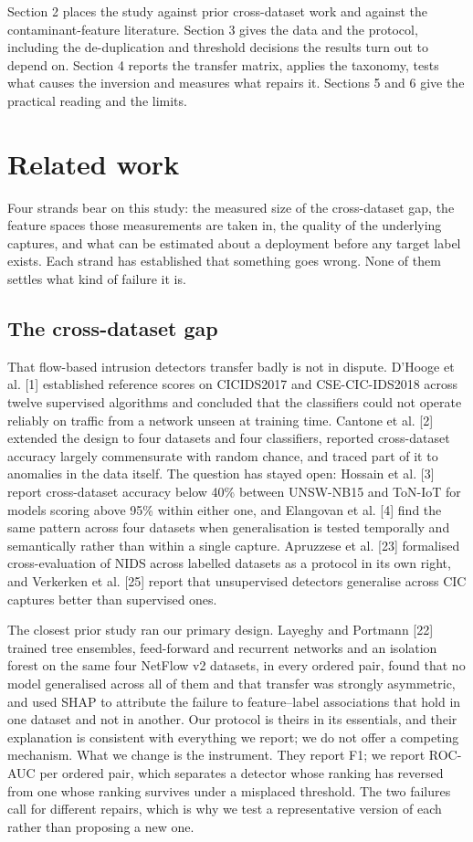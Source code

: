 \documentclass[11pt,a4paper]{article}
\begin{document}
Section 2 places the study against prior cross-dataset work and against the contaminant-feature literature. Section 3 gives the data and the protocol, including the de-duplication and threshold decisions the results turn out to depend on. Section 4 reports the transfer matrix, applies the taxonomy, tests what causes the inversion and measures what repairs it. Sections 5 and 6 give the practical reading and the limits.


\section{Related work}

Four strands bear on this study: the measured size of the cross-dataset gap, the feature spaces those measurements are taken in, the quality of the underlying captures, and what can be estimated about a deployment before any target label exists. Each strand has established that something goes wrong. None of them settles what kind of failure it is.

\subsection{The cross-dataset gap}

That flow-based intrusion detectors transfer badly is not in dispute. D'Hooge et al. [1] established reference scores on CICIDS2017 and CSE-CIC-IDS2018 across twelve supervised algorithms and concluded that the classifiers could not operate reliably on traffic from a network unseen at training time. Cantone et al. [2] extended the design to four datasets and four classifiers, reported cross-dataset accuracy largely commensurate with random chance, and traced part of it to anomalies in the data itself. The question has stayed open: Hossain et al. [3] report cross-dataset accuracy below 40\% between UNSW-NB15 and ToN-IoT for models scoring above 95\% within either one, and Elangovan et al. [4] find the same pattern across four datasets when generalisation is tested temporally and semantically rather than within a single capture. Apruzzese et al. [23] formalised cross-evaluation of NIDS across labelled datasets as a protocol in its own right, and Verkerken et al. [25] report that unsupervised detectors generalise across CIC captures better than supervised ones.

The closest prior study ran our primary design. Layeghy and Portmann [22] trained tree ensembles, feed-forward and recurrent networks and an isolation forest on the same four NetFlow v2 datasets, in every ordered pair, found that no model generalised across all of them and that transfer was strongly asymmetric, and used SHAP to attribute the failure to feature--label associations that hold in one dataset and not in another. Our protocol is theirs in its essentials, and their explanation is consistent with everything we report; we do not offer a competing mechanism. What we change is the instrument. They report F1; we report ROC-AUC per ordered pair, which separates a detector whose ranking has reversed from one whose ranking survives under a misplaced threshold. The two failures call for different repairs, which is why we test a representative version of each rather than proposing a new one.
\end{document}
